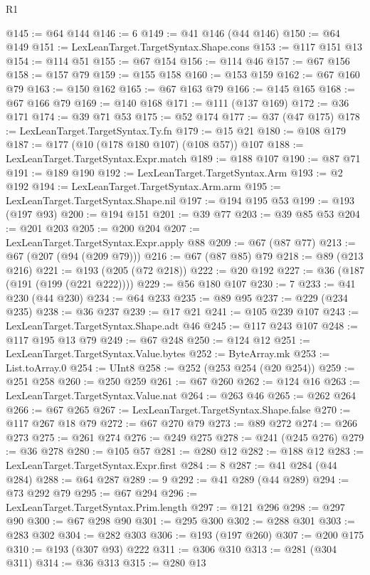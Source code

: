 \begin{lexlean}{R1}
\begin{coremodule}
@145 := @64 @144
@146 := 6
@149 := @41 @146 (@44 @146)
@150 := @64 @149
@151 := LexLeanTarget.TargetSyntax.Shape.cons
@153 := @117 @151 @13
@154 := @114 @51
@155 := @67 @154
@156 := @114 @46
@157 := @67 @156
@158 := @157 @79
@159 := @155 @158
@160 := @153 @159
@162 := @67 @160 @79
@163 := @150 @162
@165 := @67 @163 @79
@166 := @145 @165
@168 := @67 @166 @79
@169 := @140 @168
@171 := @111 (@137 @169)
@172 := @36 @171
@174 := @39 @71 @53
@175 := @52 @174
@177 := @37 (@47 @175)
@178 := LexLeanTarget.TargetSyntax.Ty.fn
@179 := @15 @21
@180 := @108 @179
@187 := @177 (@10 (@178 @180 @107) (@108 @57)) @107
@188 := LexLeanTarget.TargetSyntax.Expr.match
@189 := @188 @107
@190 := @87 @71
@191 := @189 @190
@192 := LexLeanTarget.TargetSyntax.Arm
@193 := @2 @192
@194 := LexLeanTarget.TargetSyntax.Arm.arm
@195 := LexLeanTarget.TargetSyntax.Shape.nil
@197 := @194 @195 @53
@199 := @193 (@197 @93)
@200 := @194 @151
@201 := @39 @77
@203 := @39 @85 @53
@204 := @201 @203
@205 := @200 @204
@207 := LexLeanTarget.TargetSyntax.Expr.apply @88
@209 := @67 (@87 @77)
@213 := @67 (@207 (@94 (@209 @79)))
@216 := @67 (@87 @85) @79
@218 := @89 (@213 @216)
@221 := @193 (@205 (@72 @218))
@222 := @20 @192
@227 := @36 (@187 (@191 (@199 (@221 @222))))
@229 := @56 @180 @107
@230 := 7
@233 := @41 @230 (@44 @230)
@234 := @64 @233
@235 := @89 @95
@237 := @229 (@234 @235)
@238 := @36 @237
@239 := @17 @21
@241 := @105 @239 @107
@243 := LexLeanTarget.TargetSyntax.Shape.adt @46
@245 := @117 @243 @107
@248 := @117 @195 @13 @79
@249 := @67 @248
@250 := @124 @12
@251 := LexLeanTarget.TargetSyntax.Value.bytes
@252 := ByteArray.mk
@253 := List.toArray.{0}
@254 := UInt8
@258 := @252 (@253 @254 (@20 @254))
@259 := @251 @258
@260 := @250 @259
@261 := @67 @260
@262 := @124 @16
@263 := LexLeanTarget.TargetSyntax.Value.nat
@264 := @263 @46
@265 := @262 @264
@266 := @67 @265
@267 := LexLeanTarget.TargetSyntax.Shape.false
@270 := @117 @267 @18 @79
@272 := @67 @270 @79
@273 := @89 @272
@274 := @266 @273
@275 := @261 @274
@276 := @249 @275
@278 := @241 (@245 @276)
@279 := @36 @278
@280 := @105 @57
@281 := @280 @12
@282 := @188 @12
@283 := LexLeanTarget.TargetSyntax.Expr.first
@284 := 8
@287 := @41 @284 (@44 @284)
@288 := @64 @287
@289 := 9
@292 := @41 @289 (@44 @289)
@294 := @73 @292 @79
@295 := @67 @294
@296 := LexLeanTarget.TargetSyntax.Prim.length
@297 := @121 @296
@298 := @297 @90
@300 := @67 @298 @90
@301 := @295 @300
@302 := @288 @301
@303 := @283 @302
@304 := @282 @303
@306 := @193 (@197 @260)
@307 := @200 @175
@310 := @193 (@307 @93) @222
@311 := @306 @310
@313 := @281 (@304 @311)
@314 := @36 @313
@315 := @280 @13

\end{coremodule}
\end{lexlean}
